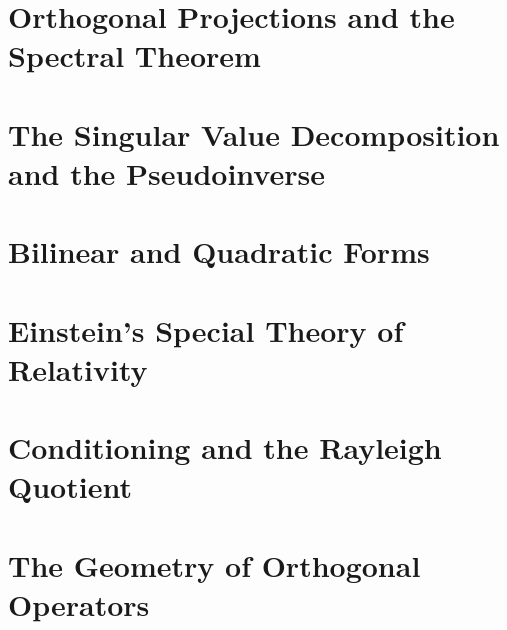 \section{Orthogonal Projections and the Spectral Theorem}


\section{The Singular Value Decomposition and the
Pseudoinverse}


\section{Bilinear and Quadratic Forms}


\section{Einstein's Special Theory of Relativity}


\section{Conditioning and the Rayleigh Quotient}


\section{The Geometry of Orthogonal Operators}